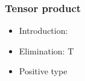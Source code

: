 \documentclass{beamer}
\begin{document}
  \begin{frame}
    \frametitle{Tensor product}
    \begin{itemize}
    \item Introduction:
                {\ctx{\Gamma}{\Delta} \vdash {} \ni {}}
    \item Elimination:
                {\ctx{\Gamma}{\Delta} \vdash {} \in T}
    \item Positive type
    \end{itemize}
  \end{frame}
\end{document}
